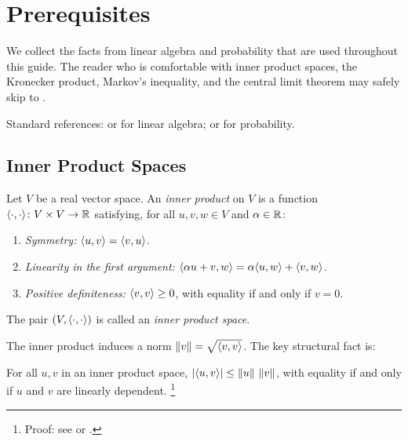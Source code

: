 
\chapter{Prerequisites}\label{ch:prereqs}

We collect the facts from linear algebra and probability that are used
throughout this guide. The reader who is comfortable with inner product
spaces, the Kronecker product, Markov's inequality, and the central limit
theorem may safely skip to .

Standard references: \citet{axler2024linear} or \citet{horn2012matrix} for
linear algebra; \citet{durrett2019probability} or \citet{feller1971introduction}
for probability.

\section{Inner Product Spaces}\label{sec:inner-product-spaces}

\begin{definition}\label{def:inner-product}
Let $V$ be a real vector space. An \emph{inner product} on $V$ is a
function $\langle \cdot, \cdot \rangle \colon V \times V \to \mathbb{R}$ satisfying, for all
$u, v, w \in V$ and $\alpha \in \mathbb{R}$:
\begin{enumerate}[label=(\roman*)]
  \item \emph{Symmetry:} $\langle u, v \rangle = \langle v, u \rangle$.
  \item \emph{Linearity in the first argument:}
        $\langle \alpha u + v, w \rangle = \alpha\langle u, w \rangle + \langle v, w \rangle$.
  \item \emph{Positive definiteness:} $\langle v, v \rangle \geq 0$, with equality
        if and only if $v = 0$.
\end{enumerate}
The pair $(V, \langle \cdot, \cdot \rangle)$ is called an \emph{inner product space}.
\end{definition}

The inner product induces a norm $\left\| v \right\| = \sqrt{\langle v, v \rangle}$.
The key structural fact is:

\begin{theorem}\label{thm:cauchy-schwarz}
For all $u, v$ in an inner product space,
$|\langle u, v \rangle| \leq \left\| u \right\|\,\left\| v \right\|$,
with equality if and only if $u$ and $v$ are linearly dependent.%
\footnote{Proof: see \citet[Chapter~6]{axler2024linear} or
\citet[Section~5.1]{horn2012matrix}.}
\end{theorem}

